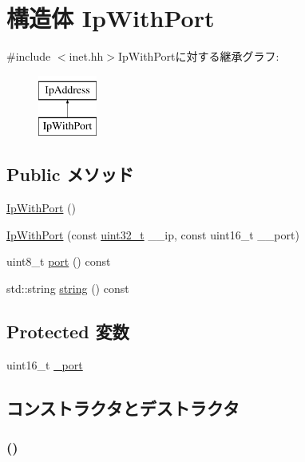 \hypertarget{structNet_1_1IpWithPort}{
\section{構造体 IpWithPort}
\label{structNet_1_1IpWithPort}
}


{\ttfamily \#include $<$inet.hh$>$}IpWithPortに対する継承グラフ:\begin{figure}[H]
\begin{center}
\leavevmode
\includegraphics[height=2cm]{structNet_1_1IpWithPort}
\end{center}
\end{figure}
\subsection*{Public メソッド}
\begin{DoxyCompactItemize}
\item 
\hyperlink{structNet_1_1IpWithPort_a1771a6da4d74457f6e966b0d72d4145b}{IpWithPort} ()
\item 
\hyperlink{structNet_1_1IpWithPort_a746247c56e595fc6f43a1e0795141dc8}{IpWithPort} (const \hyperlink{Type_8hh_a435d1572bf3f880d55459d9805097f62}{uint32\_\-t} \_\-\_\-ip, const uint16\_\-t \_\-\_\-port)
\item 
uint8\_\-t \hyperlink{structNet_1_1IpWithPort_a6eef45013e8da0731ab2f08b19bac9fd}{port} () const 
\item 
std::string \hyperlink{structNet_1_1IpWithPort_a14a0e4fdb44bd7be64a3c6e5d94f8f0e}{string} () const 
\end{DoxyCompactItemize}
\subsection*{Protected 変数}
\begin{DoxyCompactItemize}
\item 
uint16\_\-t \hyperlink{structNet_1_1IpWithPort_a88bd61cbe4cfff3dd0b207683764b309}{\_\-port}
\end{DoxyCompactItemize}


\subsection{コンストラクタとデストラクタ}
\hypertarget{structNet_1_1IpWithPort_a1771a6da4d74457f6e966b0d72d4145b}{
\subsubsection[{IpWithPort}]{ ()}}
\label{structNet_1_1IpWithPort_a1771a6da4d74457f6e966b0d72d4145b}



